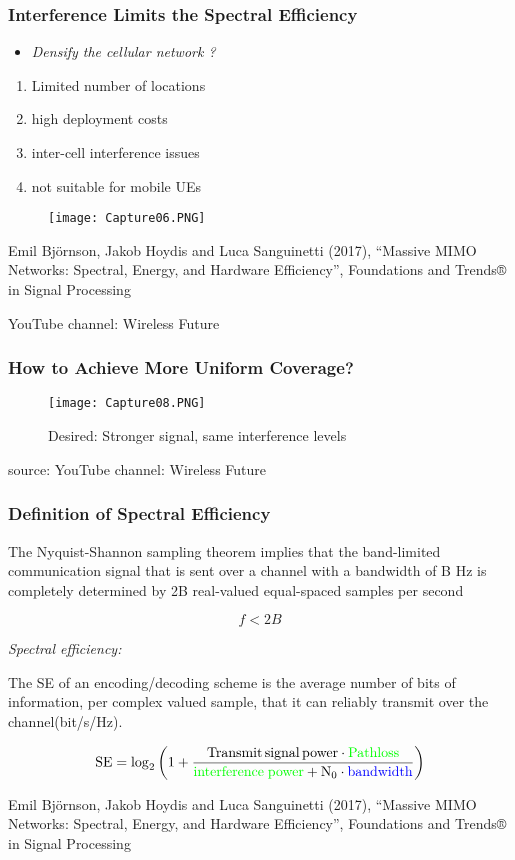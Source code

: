 \documentclass{beamer}
\begin{document}
\begin{frame}[fragile=singleslide]\frametitle{Interference Limits the Spectral Efficiency}
\begin{itemize}
\item \textit{Densify the cellular network ?}
\end{itemize}
\begin{enumerate}
\item Limited number of locations
\item high deployment costs 
\item inter-cell interference issues
\item not suitable for mobile UEs
\end{enumerate}
\begin{figure}
  \texttt{[image: Capture06.PNG]}
\end{figure}
\tiny Emil Björnson, Jakob Hoydis and Luca Sanguinetti (2017), “Massive MIMO Networks: Spectral, Energy, and Hardware Efficiency”, Foundations and Trends® in Signal Processing

\tiny YouTube channel: Wireless Future
\end{frame}


\begin{frame}[fragile=singleslide]\frametitle{How to Achieve More Uniform Coverage?}
\begin{figure}
  \texttt{[image: Capture08.PNG]}
\caption{Desired: Stronger signal, same interference levels} 
\end{figure}
\tiny source: YouTube channel: Wireless Future
\end{frame}

\begin{frame}[fragile=singleslide]\frametitle{Definition of Spectral Efficiency}
The Nyquist-Shannon sampling theorem implies that the band-limited communication signal that is sent over a channel with a bandwidth of B Hz is completely determined by 2B real-valued equal-spaced samples per second

$$f < 2B$$ %

\textit{Spectral efficiency:}

The SE of an encoding/decoding scheme is the average number of bits of information, per complex valued sample, that it can reliably transmit over the channel(bit/s/Hz).

$$\mathrm{ SE = \log_{2}\left(1+\frac{Transmit\, signal\, power \cdot \textcolor{green}{Pathloss}}{\textcolor{green}{interference\; power} + N_{0} \cdot \textcolor{blue}{bandwidth}}\right) }$$ %

\vspace{0.4cm}

\tiny Emil Björnson, Jakob Hoydis and Luca Sanguinetti (2017), “Massive MIMO Networks: Spectral, Energy, and Hardware Efficiency”, Foundations and Trends® in Signal Processing
\end{frame}
\end{document}
